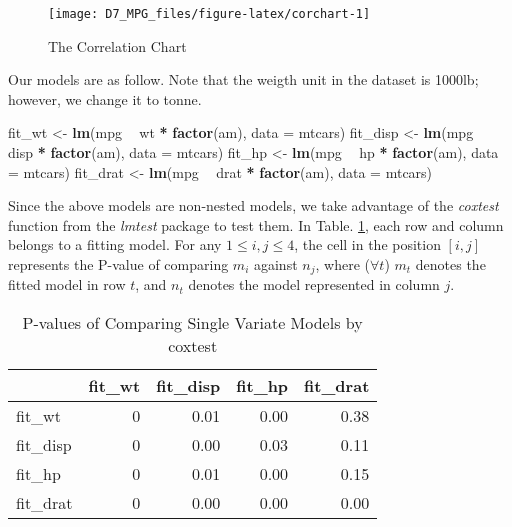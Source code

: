 \documentclass[]{article}
\newenvironment{Shaded}{\begin{snugshade}}{\end{snugshade}}
\newcommand{\KeywordTok}[1]{\textcolor[rgb]{0.13,0.29,0.53}{\textbf{#1}}}
\newcommand{\DataTypeTok}[1]{\textcolor[rgb]{0.13,0.29,0.53}{#1}}
\newcommand{\StringTok}[1]{\textcolor[rgb]{0.31,0.60,0.02}{#1}}
\newcommand{\OperatorTok}[1]{\textcolor[rgb]{0.81,0.36,0.00}{\textbf{#1}}}
\newcommand{\NormalTok}[1]{#1}
\begin{document}
\begin{figure}[H]

{\centering \texttt{[image: D7\_MPG\_files/figure-latex/corchart-1]} 

}

\caption{\label{fig:cor-chart}The Correlation Chart}\label{fig:corchart}
\end{figure}

Our models are as follow. Note that the weigth unit in the dataset is
1000lb; however, we change it to tonne.

\begin{Shaded}
\begin{Highlighting}[]
\NormalTok{fit_wt <-}\StringTok{ }\KeywordTok{lm}\NormalTok{(mpg }\OperatorTok{~}\StringTok{ }\NormalTok{wt }\OperatorTok{*}\StringTok{ }\KeywordTok{factor}\NormalTok{(am), }\DataTypeTok{data =}\NormalTok{ mtcars)}
\NormalTok{fit_disp <-}\StringTok{ }\KeywordTok{lm}\NormalTok{(mpg }\OperatorTok{~}\StringTok{ }\NormalTok{disp  }\OperatorTok{*}\StringTok{ }\KeywordTok{factor}\NormalTok{(am), }\DataTypeTok{data =}\NormalTok{ mtcars)}
\NormalTok{fit_hp <-}\StringTok{ }\KeywordTok{lm}\NormalTok{(mpg }\OperatorTok{~}\StringTok{ }\NormalTok{hp }\OperatorTok{*}\StringTok{ }\KeywordTok{factor}\NormalTok{(am), }\DataTypeTok{data =}\NormalTok{ mtcars)}
\NormalTok{fit_drat <-}\StringTok{ }\KeywordTok{lm}\NormalTok{(mpg }\OperatorTok{~}\StringTok{ }\NormalTok{drat }\OperatorTok{*}\StringTok{ }\KeywordTok{factor}\NormalTok{(am), }\DataTypeTok{data =}\NormalTok{ mtcars)}
\end{Highlighting}
\end{Shaded}

Since the above models are non-nested models, we take advantage of the
\emph{coxtest} function from the \emph{lmtest} package to test them. In
Table. \ref{tab:tab-pvalue}, each row and column belongs to a fitting
model. For any \(1 \leq i, j \leq 4\), the cell in the position
\([i,j]\) represents the P-value of comparing \(m_i\) against \(n_j\),
where (\(\forall t\)) \(m_t\) denotes the fitted model in row \(t\), and
\(n_t\) denotes the model represented in column \(j\).

\begin{table}[!h]

\caption{\label{tab:tab-pvalue}P-values of Comparing Single Variate Models by coxtest}
\centering
\begin{tabular}{lrrrr}
\toprule
  &    fit\_wt &    fit\_disp &    fit\_hp &    fit\_drat\\
\midrule
fit\_wt & 0 & 0.01 & 0.00 & 0.38\\
fit\_disp & 0 & 0.00 & 0.03 & 0.11\\
fit\_hp & 0 & 0.01 & 0.00 & 0.15\\
fit\_drat & 0 & 0.00 & 0.00 & 0.00\\
\bottomrule
\end{tabular}
\end{table}
\end{document}
